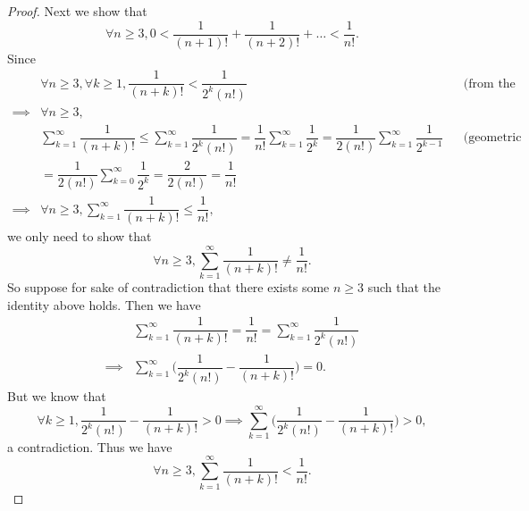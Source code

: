 \begin{proof}
  Next we show that
  \[
    \forall n \geq 3, 0 < \dfrac{1}{(n + 1)!} + \dfrac{1}{(n + 2)!} + \dots < \dfrac{1}{n!}.
  \]
  Since
  \begin{align*}
             & \forall n \geq 3, \forall k \geq 1, \dfrac{1}{(n + k)!} < \dfrac{1}{2^k (n!)}                                                                                                                        &  & \text{(from the proof above)} \\
    \implies & \forall n \geq 3,                                                                                                                                                                                                                       \\
             & \sum_{k = 1}^\infty \dfrac{1}{(n + k)!} \leq \sum_{k = 1}^\infty \dfrac{1}{2^k (n!)} = \dfrac{1}{n!} \sum_{k = 1}^\infty \dfrac{1}{2^k} = \dfrac{1}{2 (n!)} \sum_{k = 1}^\infty \dfrac{1}{2^{k - 1}} &  & \text{(geometric series)}     \\
             & = \dfrac{1}{2 (n!)} \sum_{k = 0}^\infty \dfrac{1}{2^k} = \dfrac{2}{2 (n!)} = \dfrac{1}{n!}                                                                                                                                              \\
    \implies & \forall n \geq 3, \sum_{k = 1}^\infty \dfrac{1}{(n + k)!} \leq \dfrac{1}{n!},
  \end{align*}
  we only need to show that
  \[
    \forall n \geq 3, \sum_{k = 1}^\infty \dfrac{1}{(n + k)!} \neq \dfrac{1}{n!}.
  \]
  So suppose for sake of contradiction that there exists some \(n \geq 3\) such that the identity above holds.
  Then we have
  \begin{align*}
             & \sum_{k = 1}^\infty \dfrac{1}{(n + k)!} = \dfrac{1}{n!} = \sum_{k = 1}^\infty \dfrac{1}{2^k (n!)} \\
    \implies & \sum_{k = 1}^\infty \bigg(\dfrac{1}{2^k (n!)} - \dfrac{1}{(n + k)!}\bigg) = 0.
  \end{align*}
  But we know that
  \[
    \forall k \geq 1, \dfrac{1}{2^k (n!)} - \dfrac{1}{(n + k)!} > 0 \implies \sum_{k = 1}^\infty \bigg(\dfrac{1}{2^k (n!)} - \dfrac{1}{(n + k)!}\bigg) > 0,
  \]
  a contradiction.
  Thus we have
  \[
    \forall n \geq 3, \sum_{k = 1}^\infty \dfrac{1}{(n + k)!} < \dfrac{1}{n!}.
  \]


\end{proof}
